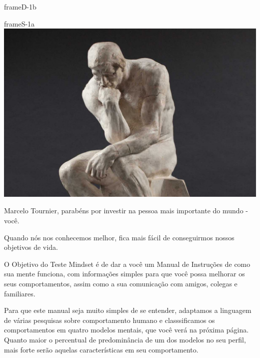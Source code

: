 \documentclass[14pt]{extreport}
\begin{document}
%

\texto

\pagestyle{empty}
\begingroup
  \null
  \newpage
\endgroup



\ClearShipoutPicture

\begin{dynamiccontents*}{frameD-1b}
\end{dynamiccontents*}

\pagestyle{empty}

\newpage

\begin{staticcontents*}{frameS-1a}
\includegraphics[width=210mm]{img/fig1.jpg}
\end{staticcontents*}

\hfill
\vspace{100mm}

{Marcelo Tournier}, parabéns por investir na pessoa mais importante do mundo - você.

Quando nós nos conhecemos melhor, fica mais fácil de conseguirmos nossos objetivos de vida.

O Objetivo do Teste Mindset é de dar a você um Manual de Instruções de como sua mente funciona, com informações simples para que você possa melhorar os seus comportamentos, assim como a sua comunicação com amigos, colegas e familiares.

Para que este manual seja muito simples de se entender, adaptamos a linguagem de várias pesquisas sobre comportamento humano e classsificamos os comportamentos em quatro modelos mentais, que você verá na próxima página.  Quanto maior o percentual de predominância de um dos modelos no seu perfil, mais forte serão aquelas características em seu comportamento.  
\end{document}
